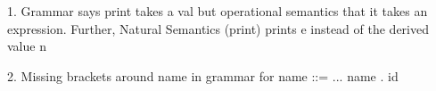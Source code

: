 1. Grammar says print takes a val but operational semantics that it takes an expression.
   Further, Natural Semantics (print) prints e instead of the derived value n

2. Missing brackets around name in grammar for name ::= ... name . id